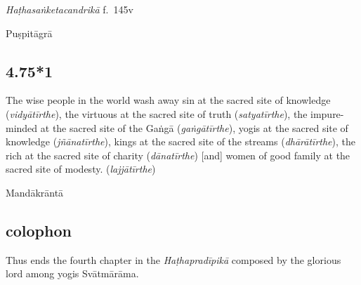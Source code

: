 \begin{ekdosis}
\begin{testimonia}[hp04_075]
\emph{Haṭhasaṅketacandrikā} f.~145v
\begin{versinnote}
\end{versinnote}
\end{testimonia}

\begin{philcomm}[hp04_075]
\end{philcomm}

\begin{metre}[hp04_075]
Puṣpitāgrā
\end{metre}

\subsection*{4.75*1}
\begin{translation}[hp04_75_1] The wise people in the world wash away sin at the sacred site of knowledge (\emph{vidyātīrthe}), the virtuous at the sacred site of truth (\emph{satyatīrthe}), the impure-minded at the sacred site of the Gaṅgā (\emph{gaṅgātīrthe}), yogis at the sacred site of knowledge (\emph{jñānatīrthe}), kings at the sacred site of the streams (\emph{dhārātīrthe}), the rich at the sacred site of charity (\emph{dānatīrthe}) [and] women of good family at the sacred site of modesty. (\emph{lajjātīrthe})
\end{translation}
%




\begin{metre}[hp04_075_1]
Mandākrāntā 
\end{metre}

\subsection*{colophon}
\begin{translation}[hp04_col]
Thus ends the fourth chapter in the \emph{Haṭhapradīpikā} composed by the glorious lord among yogis Svātmārāma.    
\end{translation}



\end{ekdosis}

